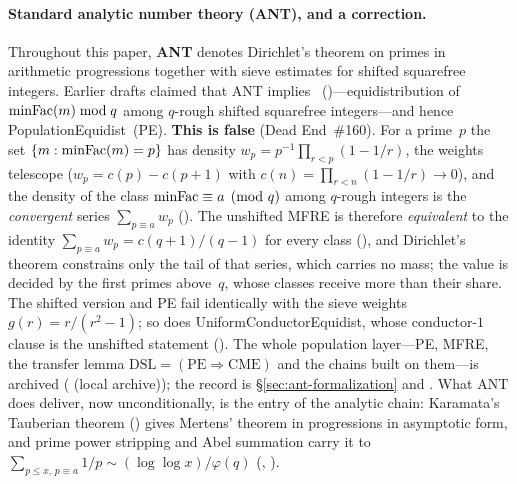 \paragraph{Standard analytic number theory (ANT), and a correction.}
\label{sec:ant-def}
Throughout this paper, \textbf{ANT} denotes Dirichlet's theorem on
primes in arithmetic progressions together with sieve estimates for
shifted squarefree integers.  Earlier drafts claimed that ANT implies
~()---equidistribution of
$\mathrm{minFac}(m) \bmod q$ among $q$-rough shifted squarefree integers---and
hence PopulationEquidist~(PE).  \textbf{This is false} (Dead
End~\#160).  For a prime~$p$ the set $\{m : \mathrm{minFac}(m) = p\}$ has
density $w_p = p^{-1}\prod_{r<p}(1-1/r)$, the weights telescope
($w_p = c(p) - c(p{+}1)$ with $c(n) = \prod_{r<n}(1-1/r) \to 0$), and
the density of the class $\mathrm{minFac} \equiv a \pmod q$ among $q$-rough
integers is the \emph{convergent} series $\sum_{p \equiv a} w_p$
().
The unshifted MFRE is therefore \emph{equivalent} to the identity
$\sum_{p\equiv a} w_p = c(q{+}1)/(q-1)$ for every class
(), and
Dirichlet's theorem constrains only the tail of that series, which
carries no mass; the value is decided by the first primes above~$q$,
whose classes receive more than their share.  The shifted version and
PE fail identically with the sieve weights $g(r)=r/(r^2-1)$; so does
UniformConductorEquidist, whose conductor-$1$ clause is the unshifted
statement ().
The whole population layer---PE, MFRE, the transfer lemma
$\mathrm{DSL} = (\mathrm{PE} \Rightarrow \mathrm{CME})$ and the chains
built on them---is archived
( (local archive)); the
record is \S\ref{sec:ant-formalization} and
.  What ANT does deliver, now
unconditionally, is the entry of the analytic chain: Karamata's
Tauberian theorem () gives Mertens' theorem
in progressions in asymptotic form, and prime power stripping and
Abel summation carry it to
$\sum_{p \leq x,\, p \equiv a} 1/p \sim (\log\log x)/\varphi(q)$
(, ).

